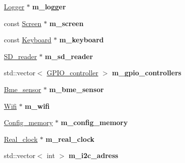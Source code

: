 \begin{DoxyCompactItemize}
\item 
\mbox{\label{class_h_a_l_1_1_init_ab47bbaa9b451c2c572d860246d12099d}} 
\hyperlink{class_logger}{Logger} $\ast$ {\bfseries m\+\_\+logger}
\item 
\mbox{\label{class_h_a_l_1_1_init_a8956d13bf073191d0ce0d2379ead147d}} 
const \hyperlink{class_h_a_l_1_1_screen}{Screen} $\ast$ {\bfseries m\+\_\+screen}
\item 
\mbox{\label{class_h_a_l_1_1_init_ac5130a10accd8f02d3f1a7787296f673}} 
const \hyperlink{class_h_a_l_1_1_keyboard}{Keyboard} $\ast$ {\bfseries m\+\_\+keyboard}
\item 
\mbox{\label{class_h_a_l_1_1_init_a3e08a7090f6ef8aef5d4837b4394b3ad}} 
\hyperlink{class_h_a_l_1_1_s_d__reader}{S\+D\+\_\+reader} $\ast$ {\bfseries m\+\_\+sd\+\_\+reader}
\item 
\mbox{\label{class_h_a_l_1_1_init_ab0db252e70957745b3578273b51b90fc}} 
std\+::vector$<$ \hyperlink{class_h_a_l_1_1_g_p_i_o__controller}{G\+P\+I\+O\+\_\+controller} $>$ {\bfseries m\+\_\+gpio\+\_\+controllers}
\item 
\mbox{\label{class_h_a_l_1_1_init_a79c1b6f42a186e421dc0f0e49e2ff7d0}} 
\hyperlink{class_h_a_l_1_1_bme__sensor}{Bme\+\_\+sensor} $\ast$ {\bfseries m\+\_\+bme\+\_\+sensor}
\item 
\mbox{\label{class_h_a_l_1_1_init_a68b1840ced404205eafd52d4c01f1dcd}} 
\hyperlink{class_h_a_l_1_1_wifi}{Wifi} $\ast$ {\bfseries m\+\_\+wifi}
\item 
\mbox{\label{class_h_a_l_1_1_init_a83b72536ebcb9ba11f4a78bd7cbf5e24}} 
\hyperlink{class_h_a_l_1_1_config__memory}{Config\+\_\+memory} $\ast$ {\bfseries m\+\_\+config\+\_\+memory}
\item 
\mbox{\label{class_h_a_l_1_1_init_ad67a460ea65545c2943d5e5464215c20}} 
\hyperlink{class_h_a_l_1_1_real__clock}{Real\+\_\+clock} $\ast$ {\bfseries m\+\_\+real\+\_\+clock}
\item 
\mbox{\label{class_h_a_l_1_1_init_a5a4bbc8f230cba3ceb6d7e62c02b9ad5}} 
std\+::vector$<$ int $>$ {\bfseries m\+\_\+i2c\+\_\+adress}
\end{DoxyCompactItemize}


